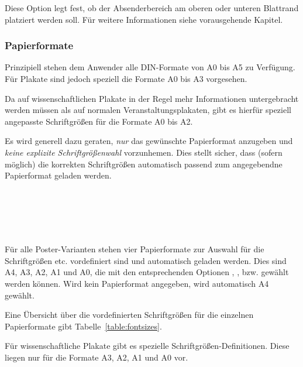 \begin{Declaration}
\end{Declaration}

Diese Option legt fest, ob der Absenderbereich am oberen oder unteren Blattrand
platziert werden soll. Für weitere Informationen siehe vorausgehende Kapitel.


\subsubsection{Papierformate}%

Prinzipiell stehen dem Anwender alle DIN-Formate von A0 bis A5 zu Verfügung.
Für Plakate sind jedoch speziell die Formate A0 bis A3 vorgesehen.

Da auf wissenschaftlichen Plakate in der Regel mehr Informationen untergebracht
werden müssen als auf normalen Veranstaltungsplakaten, gibt es hierfür
speziell angepasste Schriftgrößen für die Formate A0 bis A2.

\begin{important}
Es wird generell dazu geraten, \emph{nur} das gewünschte Papierformat
anzugeben und \emph{keine explizite Schriftgrößenwahl} vorzunhemen.
Dies stellt sicher, dass (sofern möglich) die korrekten Schriftgrößen
automatisch passend zum angegebendne Papierformat geladen werden.
\end{important}



\begin{Declaration}
  \\
  \\
  \\
  \\
\end{Declaration}

Für alle Poster-Varianten stehen vier Papierformate zur Auswahl für die
Schriftgrößen etc. vordefiniert sind und automatisch geladen werden.
Dies sind A4, A3, A2, A1 und A0, die mit den entsprechenden Optionen
, ,  bzw. 
gewählt werden können.
Wird kein Papierformat angegeben, wird automatisch A4 gewählt.

Eine Übersicht über die vordefinierten Schriftgrößen für die einzelnen
Papierformate gibt Tabelle~\ref{table:fontsizes}.

\begin{important}
  Für wissenschaftliche Plakate gibt es spezielle Schriftgrößen-Definitionen.
  Diese liegen nur für die Formate A3, A2, A1 und A0 vor.
\end{important}

